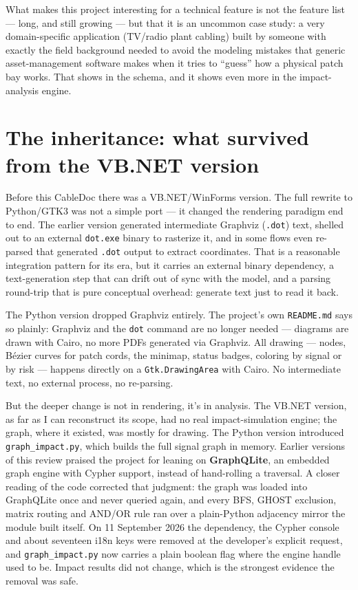 \documentclass[10.4pt,twocolumn]{article}
\begin{document}
What makes this project interesting for a technical feature is not the feature list --- long, and still growing --- but that it is an uncommon case study: a very domain-specific application (TV/radio plant cabling) built by someone with exactly the field background needed to avoid the modeling mistakes that generic asset-management software makes when it tries to ``guess'' how a physical patch bay works. That shows in the schema, and it shows even more in the impact-analysis engine.

\section{The inheritance: what survived from the VB.NET version}

Before this CableDoc there was a VB.NET/WinForms version. The full rewrite to Python/GTK3 was not a simple port --- it changed the rendering paradigm end to end. The earlier version generated intermediate Graphviz (\texttt{.dot}) text, shelled out to an external \texttt{dot.exe} binary to rasterize it, and in some flows even re-parsed that generated \texttt{.dot} output to extract coordinates. That is a reasonable integration pattern for its era, but it carries an external binary dependency, a text-generation step that can drift out of sync with the model, and a parsing round-trip that is pure conceptual overhead: generate text just to read it back.

The Python version dropped Graphviz entirely. The project's own \texttt{README.md} says so plainly: Graphviz and the \texttt{dot} command are no longer needed --- diagrams are drawn with Cairo, no more PDFs generated via Graphviz. All drawing --- nodes, Bézier curves for patch cords, the minimap, status badges, coloring by signal or by risk --- happens directly on a \texttt{Gtk.DrawingArea} with Cairo. No intermediate text, no external process, no re-parsing.

But the deeper change is not in rendering, it's in analysis. The VB.NET version, as far as I can reconstruct its scope, had no real impact-simulation engine; the graph, where it existed, was mostly for drawing. The Python version introduced \texttt{graph\_impact.py}, which builds the full signal graph in memory. Earlier versions of this review praised the project for leaning on \textbf{GraphQLite}, an embedded graph engine with Cypher support, instead of hand-rolling a traversal. A closer reading of the code corrected that judgment: the graph was loaded into GraphQLite once and never queried again, and every BFS, GHOST exclusion, matrix routing and AND/OR rule ran over a plain-Python adjacency mirror the module built itself. On 11 September 2026 the dependency, the Cypher console and about seventeen i18n keys were removed at the developer's explicit request, and \texttt{graph\_impact.py} now carries a plain boolean flag where the engine handle used to be. Impact results did not change, which is the strongest evidence the removal was safe.
\end{document}
